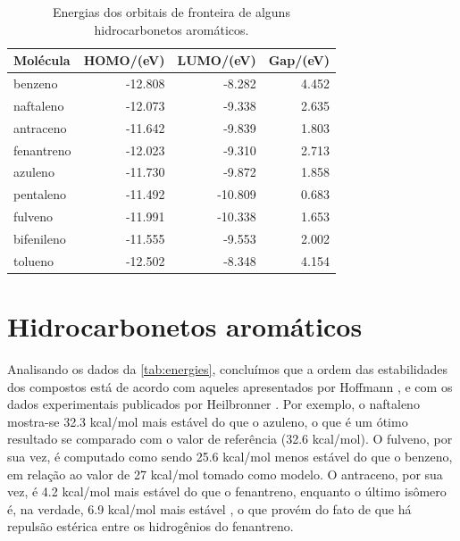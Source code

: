 \begin{table}[htb]
	\centering
	\caption{\label{qua:Quadro_1} Energias dos orbitais de fronteira de alguns hidrocarbonetos aromáticos.}	
	\begin{tabular}{lrrr}
		\toprule
		\textbf{Molécula} & \textbf{HOMO/(eV)} & \textbf{LUMO/(eV)} & \textbf{Gap/(eV)}
		\\ 
		\midrule
        benzeno & -12.808 & -8.282 & 4.452 \\
        naftaleno & -12.073 & -9.338 & 2.635 \\
        antraceno & -11.642 & -9.839 & 1.803 \\
        fenantreno & -12.023 & -9.310 & 2.713 \\
        azuleno & -11.730 & -9.872 & 1.858 \\
        pentaleno & -11.492 & -10.809 & 0.683 \\
        fulveno & -11.991 & -10.338 & 1.653 \\
        bifenileno & -11.555 & -9.553 & 2.002 \\
        tolueno & -12.502 & -8.348 & 4.154 \\
    \bottomrule
	\end{tabular}
\end{table}

\section{Hidrocarbonetos aromáticos}

Analisando os dados da \autoref{tab:energies}, concluímos que a ordem das estabilidades dos compostos está de acordo com aqueles apresentados por Hoffmann \autocite{Hoffmann1963}, e com os dados experimentais publicados por Heilbronner \autocite{ginsburg1959}. Por exemplo, o naftaleno mostra-se 32.3 kcal/mol mais estável do que o azuleno, o que é um ótimo resultado se comparado com o valor de referência (32.6 kcal/mol)\autocite{ginsburg1959}. O fulveno, por sua vez, é computado como sendo 25.6 kcal/mol menos estável do que o benzeno, em relação ao valor de 27 kcal/mol tomado como modelo\autocite{CHENG1956}. O antraceno, por sua vez, é 4.2 kcal/mol mais estável do que o fenantreno, enquanto o último isômero é, na verdade, 6.9 kcal/mol mais estável \autocite{Hoffmann1963}, o que provém do fato de que há repulsão estérica entre os hidrogênios do fenantreno.

